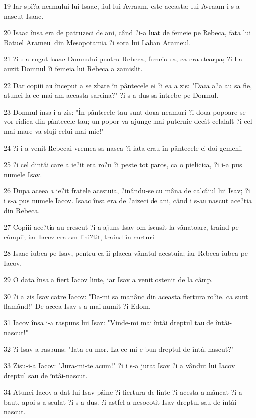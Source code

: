 \par 19 Iar spi?a neamului lui Isaac, fiul lui Avraam, este aceasta: lui Avraam i s-a nascut Isaac.
\par 20 Isaac însa era de patruzeci de ani, când ?i-a luat de femeie pe Rebeca, fata lui Batuel Arameul din Mesopotamia ?i sora lui Laban Arameul.
\par 21 ?i s-a rugat Isaac Domnului pentru Rebeca, femeia sa, ca era stearpa; ?i l-a auzit Domnul ?i femeia lui Rebeca a zamislit.
\par 22 Dar copiii au început a se zbate în pântecele ei ?i ea a zis: "Daca a?a au sa fie, atunci la ce mai am aceasta sarcina?" ?i s-a dus sa întrebe pe Domnul.
\par 23 Domnul însa i-a zis: "În pântecele tau sunt doua neamuri ?i doua popoare se vor ridica din pântecele tau; un popor va ajunge mai puternic decât celalalt ?i cel mai mare va sluji celui mai mic!"
\par 24 ?i i-a venit Rebecai vremea sa nasca ?i iata erau în pântecele ei doi gemeni.
\par 25 ?i cel dintâi care a ie?it era ro?u ?i peste tot paros, ca o pielicica, ?i i-a pus numele Isav.
\par 26 Dupa aceea a ie?it fratele acestuia, ?inându-se cu mâna de calcâiul lui Isav; ?i i s-a pus numele Iacov. Isaac însa era de ?aizeci de ani, când i s-au nascut ace?tia din Rebeca.
\par 27 Copiii ace?tia au crescut ?i a ajuns Isav om iscusit la vânatoare, traind pe câmpii; iar Iacov era om lini?tit, traind în corturi.
\par 28 Isaac iubea pe Isav, pentru ca îi placea vânatul acestuia; iar Rebeca iubea pe Iacov.
\par 29 O data însa a fiert Iacov linte, iar Isav a venit ostenit de la câmp.
\par 30 ?i a zis Isav catre Iacov: "Da-mi sa manânc din aceasta fiertura ro?ie, ca sunt flamând!" De aceea Isav s-a mai numit ?i Edom.
\par 31 Iacov însa i-a raspuns lui Isav: "Vinde-mi mai întâi dreptul tau de întâi-nascut!"
\par 32 ?i Isav a raspuns: "Iata eu mor. La ce mi-e bun dreptul de întâi-nascut?"
\par 33 Zisu-i-a Iacov: "Jura-mi-te acum!" ?i i s-a jurat Isav ?i a vândut lui Iacov dreptul sau de întâi-nascut.
\par 34 Atunci Iacov a dat lui Isav pâine ?i fiertura de linte ?i acesta a mâncat ?i a baut, apoi s-a sculat ?i s-a dus. ?i astfel a nesocotit Isav dreptul sau de întâi-nascut.

